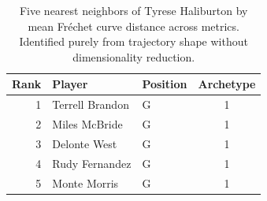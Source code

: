 \begin{table}[htbp]
  \centering\small
  \begin{tabular}{rllc}
    \toprule
    Rank & Player & Position & Archetype \\
    \midrule
    1 & Terrell Brandon & G & 1 \\
    2 & Miles McBride & G & 1 \\
    3 & Delonte West & G & 1 \\
    4 & Rudy Fernandez & G & 1 \\
    5 & Monte Morris & G & 1 \\
    \bottomrule
  \end{tabular}
  \caption{Five nearest neighbors of Tyrese Haliburton by mean Fr\'{e}chet curve distance across metrics. Identified purely from trajectory shape without dimensionality reduction.}
  \label{tab:Tyrese_Haliburton_frechet_curve_neighbors}
\end{table}

